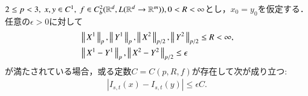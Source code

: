 	\begin{screen}
		\begin{thm}\label{thm:continuity_theorem_2}
			$2 \leq p < 3,\ x,y \in C^1,\ f \in C^2_b(\mathbb{R}^d,L(\mathbb{R}^d \rightarrow \mathbb{R}^m)), 0 < R < \infty$とし，$x_0 = y_0$を仮定する．
			任意の$\epsilon > 0$に対して
			\begin{align}
				&\left\|\, X^1\, \right\|_{p},\left\|\, Y^1\, \right\|_{p},\left\|\, X^2\, \right\|_{p/2},\left\|\, Y^2\, \right\|_{p/2} \leq R < \infty,\\
				&\left\|\, X^1 - Y^1\, \right\|_{p},\left\|\, X^2 - Y^2\, \right\|_{p/2} \leq \epsilon
			\end{align}
			が満たされている場合，或る定数$C = C(p,R,f)$が存在して次が成り立つ:
			\begin{align}
				\left| I_{s,t}(x) - I_{s,t}(y) \right| \leq \epsilon C.
			\end{align}
		\end{thm}
	\end{screen}